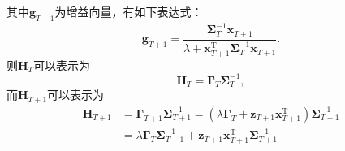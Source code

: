 其中\( \bm{g}_{T+1} \)为增益向量，有如下表达式：
\[
    \bm{g}_{T+1} = \frac{\mathbf{\Sigma}_T^{-1} \bm{x}_{T+1}}{\lambda + \bm{x}_{T+1}^\mathrm{T} \mathbf{\Sigma}_T^{-1} \bm{x}_{T+1}}.
\]
则\( \mathbf{H}_T \)可以表示为
\[
    \mathbf{H}_T = \mathbf{\Gamma}_T \mathbf{\Sigma}_T^{-1},
\]
而\( \mathbf{H}_{T+1} \)可以表示为
\[
    \begin{split}
        \mathbf{H}_{T+1} & = \mathbf{\Gamma}_{T+1} \mathbf{\Sigma}_{T+1}^{-1} = (\lambda \mathbf{\Gamma}_T + \bm{z}_{T+1}\bm{x}_{T+1}^\mathrm{T}) \mathbf{\Sigma}_{T+1}^{-1} \\
                         & = \lambda \mathbf{\Gamma}_T \mathbf{\Sigma}_{T+1}^{-1} + \bm{z}_{T+1}\bm{x}_{T+1}^\mathrm{T} \mathbf{\Sigma}_{T+1}^{-1}                           \\
    \end{split}
\]

